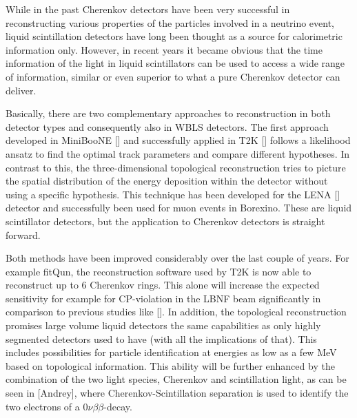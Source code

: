%
%
%
%
%
%
%


While in the past Cherenkov detectors have been very successful in reconstructing various properties of the particles involved
in a neutrino event, liquid scintillation detectors have long been thought as a source for calorimetric information only. 
However, in recent years it became obvious that the time information of the light in liquid scintillators can be used to 
access a wide range of information, similar or even superior to what a pure Cherenkov detector can deliver. 

Basically, there are two complementary approaches to reconstruction in both detector types and consequently also in WBLS 
detectors. The first approach developed in MiniBooNE [] and successfully applied in T2K [] follows a likelihood ansatz to 
find the optimal track parameters and compare different hypotheses. In contrast to this, the three-dimensional topological 
reconstruction tries to picture the spatial distribution of the energy deposition within the detector without using a 
specific hypothesis. This technique has been developed for the LENA [] detector and successfully been used for muon events 
in Borexino. These are liquid scintillator detectors, but the application to Cherenkov detectors is straight forward. 

Both methods have been improved considerably over the last couple of years. For example fitQun, the reconstruction software 
used by T2K is now able to reconstruct up to 6 Cherenkov rings. This alone will increase the expected sensitivity 
for example for CP-violation in the LBNF beam significantly in comparison to previous studies like []. In addition, the 
topological reconstruction promises large volume liquid detectors the same capabilities as only highly segmented detectors 
used to have (with all the implications of that). This includes possibilities for particle identification at energies as low as
a few MeV based on topological information. This ability will be further enhanced by the combination of the two light species,
Cherenkov and scintillation light, as can be seen in [Andrey], where Cherenkov-Scintillation separation is used to
identify the two electrons of a 0$\nu\beta\beta$-decay.

